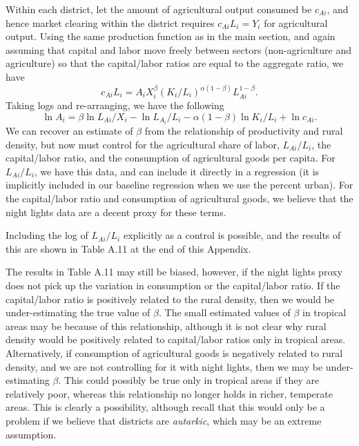 \documentclass[11pt]{article}
\begin{document}
Within each district, let the amount of agricultural output consumed be $c_{Ai}$, and hence market clearing within the district requires $c_{Ai} L_i = Y_i$ for agricultural output. Using the same production function as in the main section, and again assuming that capital and labor move freely between sectors (non-agriculture and agriculture) so that the capital/labor ratios are equal to the aggregate ratio, we have
\begin{equation}
    c_{Ai} L_i = A_i X_i^{\beta} \left(K_i/L_i\right)^{\alpha(1-\beta)} L_{Ai}^{1-\beta}. \nonumber
\end{equation}
Taking logs and re-arranging, we have the following
\begin{equation}
    \ln A_i = \beta \ln L_{Ai}/X_i - \ln L_{A_i}/L_i - \alpha(1-\beta) \ln K_{i}/L_{i} + \ln c_{Ai}. \nonumber
\end{equation}
We can recover an estimate of $\beta$ from the relationship of productivity and rural density, but now must control for the agricultural share of labor, $L_{Ai}/L_i$, the capital/labor ratio, and the consumption of agricultural goods per capita. For $L_{Ai}/L_i$, we have this data, and can include it directly in a regression (it is implicitly included in our baseline regression when we use the percent urban). For the capital/labor ratio and consumption of agricultural goods, we believe that the night lights data are a decent proxy for these terms.

Including the log of $L_{Ai}/L_i$ explicitly as a control is possible, and the results of this are shown in Table A.11 at the end of this Appendix.

The results in Table A.11 may still be biased, however, if the night lights proxy does not pick up the variation in consumption or the capital/labor ratio. If the capital/labor ratio is positively related to the rural density, then we would be under-estimating the true value of $\beta$. The small estimated values of $\beta$ in tropical areas may be because of this relationship, although it is not clear why rural density would be positively related to capital/labor ratios only in tropical areas. Alternatively, if consumption of agricultural goods is negatively related to rural density, and we are not controlling for it with night lights, then we may be under-estimating $\beta$. This could possibly be true only in tropical areas if they are relatively poor, whereas this relationship no longer holds in richer, temperate areas. This is clearly a possibility, although recall that this would only be a problem if we believe that districts are \textit{autarkic}, which may be an extreme assumption.
\end{document}
